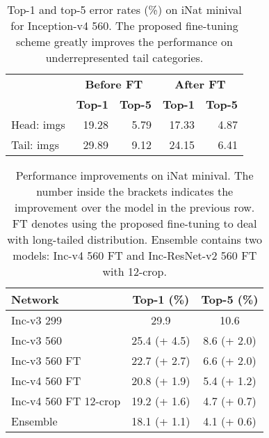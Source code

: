 \documentclass[10pt,twocolumn,letterpaper]{article}
\begin{document}
\begin{table}[t]
\small
\begin{center}
\begin{tabular}{ l|r|r|r|r }
\hline
& \multicolumn{2}{c|}{\textbf{Before FT}} & \multicolumn{2}{c}{\textbf{After FT}} \\ \cline{2-5}
& \textbf{Top-1} & \textbf{Top-5} & \textbf{Top-1} & \textbf{Top-5} \\ \hline
Head:  imgs & 19.28 & 5.79 & 17.33 & 4.87 \\
Tail:  imgs & 29.89 & 9.12 & 24.15 & 6.41 \\ \hline
\end{tabular}
\end{center}
\caption{Top-1 and top-5 error rates (\%) on iNat minival for Inception-v4 560. The proposed fine-tuning scheme greatly improves the performance on underrepresented tail categories.}
\label{tab:long-tailed}
\end{table}


\begin{table}[t]
\small
\begin{center}
\begin{tabular}{ l|c|c }\hline 
{\bf Network} & {\bf Top-1 (\%)} & {\bf Top-5 (\%)} \\ \hline
Inc-v3 299    & 29.9 & 10.6 \\
Inc-v3 560    & 25.4 (+ 4.5) & 8.6 (+ 2.0) \\
Inc-v3 560 FT & 22.7 (+ 2.7) & 6.6 (+ 2.0) \\
Inc-v4 560 FT & 20.8 (+ 1.9) & 5.4 (+ 1.2) \\
Inc-v4 560 FT 12-crop & 19.2 (+ 1.6) & 4.7 (+ 0.7) \\
Ensemble     & 18.1 (+ 1.1) & 4.1 (+ 0.6) \\ \hline 
\end{tabular}
\end{center}
\caption{Performance improvements on iNat minival. The number inside the brackets indicates the improvement over the model in the previous row. FT denotes using the proposed fine-tuning to deal with long-tailed distribution. Ensemble contains two models: Inc-v4 560 FT and Inc-ResNet-v2 560 FT with 12-crop.}
\label{tab:inat}
\end{table}
\end{document}
